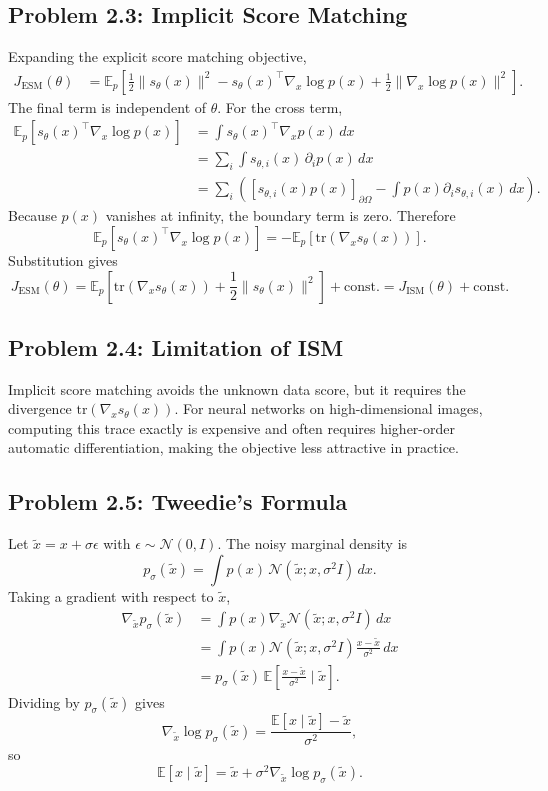 \documentclass[11pt]{article}
\newcommand{\E}{\mathbb{E}}
\newcommand{\N}{\mathcal{N}}
\newcommand{\Id}{I}
\begin{document}
\subsection*{Problem 2.3: Implicit Score Matching}
Expanding the explicit score matching objective,
\begin{align*}
J_{\mathrm{ESM}}(\theta)
&=\E_p\left[\frac12\|s_\theta(x)\|^2
-s_\theta(x)^\top\nabla_x\log p(x)
+\frac12\|\nabla_x\log p(x)\|^2\right].
\end{align*}
The final term is independent of $\theta$.  For the cross term,
\begin{align*}
\E_p[s_\theta(x)^\top\nabla_x\log p(x)]
&=\int s_\theta(x)^\top\nabla_x p(x)\,dx\\
&=\sum_i \int s_{\theta,i}(x)\,\partial_i p(x)\,dx\\
&=\sum_i \left([s_{\theta,i}(x)p(x)]_{\partial\Omega}
-\int p(x)\partial_i s_{\theta,i}(x)\,dx\right).
\end{align*}
Because $p(x)$ vanishes at infinity, the boundary term is zero.  Therefore
\[
\E_p[s_\theta(x)^\top\nabla_x\log p(x)]
=-\E_p[\mathrm{tr}(\nabla_x s_\theta(x))].
\]
Substitution gives
\[
J_{\mathrm{ESM}}(\theta)
=\E_p\left[
\mathrm{tr}(\nabla_xs_\theta(x))+\frac12\|s_\theta(x)\|^2
\right]+\mathrm{const.}
=J_{\mathrm{ISM}}(\theta)+\mathrm{const.}
\]

\subsection*{Problem 2.4: Limitation of ISM}
Implicit score matching avoids the unknown data score, but it requires the divergence $\mathrm{tr}(\nabla_x s_\theta(x))$.  For neural networks on high-dimensional images, computing this trace exactly is expensive and often requires higher-order automatic differentiation, making the objective less attractive in practice.

\subsection*{Problem 2.5: Tweedie's Formula}
Let $\tilde x=x+\sigma\epsilon$ with $\epsilon\sim\N(0,\Id)$.  The noisy marginal density is
\[
p_\sigma(\tilde x)=\int p(x)\,\N(\tilde x;x,\sigma^2\Id)\,dx.
\]
Taking a gradient with respect to $\tilde x$,
\begin{align*}
\nabla_{\tilde x}p_\sigma(\tilde x)
&=\int p(x)\nabla_{\tilde x}\N(\tilde x;x,\sigma^2\Id)\,dx\\
&=\int p(x)\N(\tilde x;x,\sigma^2\Id)
\frac{x-\tilde x}{\sigma^2}\,dx\\
&=p_\sigma(\tilde x)\,
\E\left[\frac{x-\tilde x}{\sigma^2}\mid \tilde x\right].
\end{align*}
Dividing by $p_\sigma(\tilde x)$ gives
\[
\nabla_{\tilde x}\log p_\sigma(\tilde x)
=\frac{\E[x\mid \tilde x]-\tilde x}{\sigma^2},
\]
so
\[
\E[x\mid \tilde x]=\tilde x+\sigma^2\nabla_{\tilde x}\log p_\sigma(\tilde x).
\]
\end{document}
